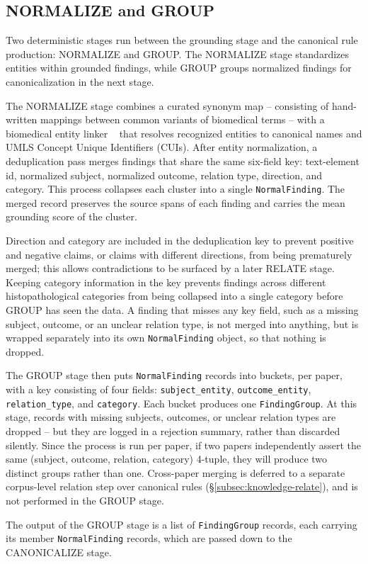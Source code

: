 \subsection{NORMALIZE and GROUP}\label{subsec:knowledge-normalize-and-group}

Two deterministic stages run between the grounding stage and the canonical rule production: NORMALIZE and GROUP. The NORMALIZE stage standardizes entities within grounded findings, while GROUP groups normalized findings for canonicalization in the next stage. 

The NORMALIZE stage combines a curated synonym map -- consisting of hand-written mappings between common variants of biomedical terms -- with a biomedical entity linker ~\parencite{neumann2019scispacy, bodenreider2004umls} that resolves recognized entities to canonical names and UMLS Concept Unique Identifiers (CUIs). After entity normalization, a deduplication pass merges findings that share the same six-field key: text-element id, normalized subject, normalized outcome, relation type, direction, and category. This process collapses each cluster into a single \texttt{NormalFinding}. The merged record preserves the source spans of each finding and carries the mean grounding score of the cluster. 

Direction and category are included in the deduplication key to prevent positive and negative claims, or claims with different directions, from being prematurely merged; this allows contradictions to be surfaced by a later RELATE stage. Keeping category information in the key prevents findings across different histopathological categories from being collapsed into a single category before GROUP has seen the data. A finding that misses any key field, such as a missing subject, outcome, or an unclear relation type, is not merged into anything, but is wrapped separately into its own \texttt{NormalFinding} object, so that nothing is dropped. 

The GROUP stage then puts \texttt{NormalFinding} records into buckets, per paper, with a key consisting of four fields: \texttt{subject\_entity}, \texttt{outcome\_entity}, \texttt{relation\_type}, and \texttt{category}. Each bucket produces one \texttt{FindingGroup}. At this stage, records with missing subjects, outcomes, or unclear relation types are dropped -- but they are logged in a rejection summary, rather than discarded silently. Since the process is run per paper, if two papers independently assert the same (subject, outcome, relation, category) 4-tuple, they will produce two distinct groups rather than one. Cross-paper merging is deferred to a separate corpus-level relation step over canonical rules (§\ref{subsec:knowledge-relate}), and is not performed in the GROUP stage.

The output of the GROUP stage is a list of \texttt{FindingGroup} records, each carrying its member \texttt{NormalFinding} records, which are passed down to the CANONICALIZE stage.
